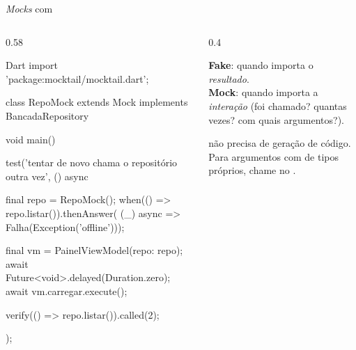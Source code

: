 \documentclass[aspectratio=169,10pt]{beamer}
\begin{document}
\begin{frame}[fragile]{\emph{Mocks} com }
  \begin{columns}[T]
    \begin{column}{0.58\textwidth}
\begin{codigo}[title=Verificando interações]{Dart}
import 'package:mocktail/mocktail.dart';

class RepoMock extends Mock implements BancadaRepository {}

void main() {
  test('tentar de novo chama o repositório outra vez',
      () async {
    final repo = RepoMock();
    when(() => repo.listar()).thenAnswer(
        (_) async => Falha(Exception('offline')));

    final vm = PainelViewModel(repo: repo);
    await Future<void>.delayed(Duration.zero);
    await vm.carregar.execute();

    verify(() => repo.listar()).called(2);
  });
}
\end{codigo}
    \end{column}
    \begin{column}{0.4\textwidth}
      \begin{conceito}
        \textbf{Fake}: quando importa o \emph{resultado}.\\
        \textbf{Mock}: quando importa a \emph{interação} (foi chamado? quantas vezes? com quais argumentos?).
      \end{conceito}
      \begin{dica}
         não precisa de geração de código. Para argumentos com  de tipos próprios, chame  no .
      \end{dica}
    \end{column}
  \end{columns}
\end{frame}
\end{document}
